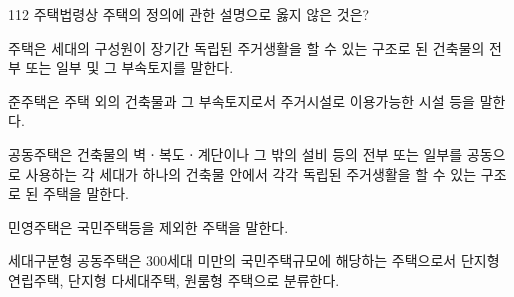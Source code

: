 \begin{question}{112}
주택법령상 주택의 정의에 관한 설명으로 옳지 않은 것은?
\begin{choices}
  \item 주택은 세대의 구성원이 장기간 독립된 주거생활을 할 수 있는 구조로 된 건축물의 전부 또는 일부 및 그 부속토지를 말한다.
  \item 준주택은 주택 외의 건축물과 그 부속토지로서 주거시설로 이용가능한 시설 등을 말한다.
  \item 공동주택은 건축물의 벽ㆍ복도ㆍ계단이나 그 밖의 설비 등의 전부 또는 일부를 공동으로 사용하는 각 세대가 하나의 건축물 안에서 각각 독립된 주거생활을 할 수 있는 구조로 된 주택을 말한다.
  \item 민영주택은 국민주택등을 제외한 주택을 말한다.
  \item 세대구분형 공동주택은 300세대 미만의 국민주택규모에 해당하는 주택으로서 단지형 연립주택, 단지형 다세대주택, 원룸형 주택으로 분류한다.
\end{choices}
\end{question}
